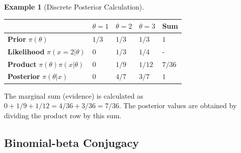 \documentclass[
  letterpaper,
  DIV=11,
  numbers=noendperiod]{scrreprt}
\renewcommand{\[}{\begin{equation}}
\renewcommand{\]}{\end{equation}}
\theoremstyle{definition}
\theoremstyle{plain}
\theoremstyle{plain}
\theoremstyle{plain}
\theoremstyle{definition}
\newtheorem{example}{Example}[chapter]
\theoremstyle{plain}
\theoremstyle{remark}
\begin{document}
\begin{example}[Discrete Posterior
Calculation]
\begin{longtable}[]{@{}
  >{\raggedright\arraybackslash}p{}
  >{\centering\arraybackslash}p{}
  >{\centering\arraybackslash}p{}
  >{\centering\arraybackslash}p{}
  >{\centering\arraybackslash}p{}@{}}
\toprule\noalign{}
\begin{minipage}[b]{\linewidth}\raggedright
\end{minipage} & \begin{minipage}[b]{\linewidth}\centering
\(\theta=1\)
\end{minipage} & \begin{minipage}[b]{\linewidth}\centering
\(\theta=2\)
\end{minipage} & \begin{minipage}[b]{\linewidth}\centering
\(\theta=3\)
\end{minipage} & \begin{minipage}[b]{\linewidth}\centering
Sum
\end{minipage} \\
\midrule\noalign{}
\endhead
\bottomrule\noalign{}
\endlastfoot
\textbf{Prior} \(\pi(\theta)\) & \(1/3\) & \(1/3\) & \(1/3\) & \(1\) \\
\textbf{Likelihood} \(\pi(x=2|\theta)\) & \(0\) & \(1/3\) & \(1/4\) &
- \\
\textbf{Product} \(\pi(\theta)\pi(x|\theta)\) & \(0\) & \(1/9\) &
\(1/12\) & \(7/36\) \\
\textbf{Posterior} \(\pi(\theta|x)\) & \(0\) & \(4/7\) & \(3/7\) &
\(1\) \\
\end{longtable}

The marginal sum (evidence) is calculated as
\(0 + 1/9 + 1/12 = 4/36 + 3/36 = 7/36\). The posterior values are
obtained by dividing the product row by this sum.

\end{example}

\subsection{Binomial-beta Conjugacy}\label{binomial-beta-conjugacy}
\end{document}
